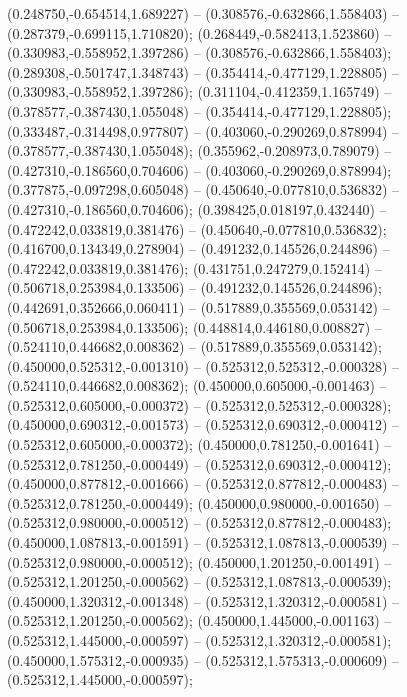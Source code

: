  (0.248750,-0.654514,1.689227) -- (0.308576,-0.632866,1.558403) -- (0.287379,-0.699115,1.710820);
 (0.268449,-0.582413,1.523860) -- (0.330983,-0.558952,1.397286) -- (0.308576,-0.632866,1.558403);
 (0.289308,-0.501747,1.348743) -- (0.354414,-0.477129,1.228805) -- (0.330983,-0.558952,1.397286);
 (0.311104,-0.412359,1.165749) -- (0.378577,-0.387430,1.055048) -- (0.354414,-0.477129,1.228805);
 (0.333487,-0.314498,0.977807) -- (0.403060,-0.290269,0.878994) -- (0.378577,-0.387430,1.055048);
 (0.355962,-0.208973,0.789079) -- (0.427310,-0.186560,0.704606) -- (0.403060,-0.290269,0.878994);
 (0.377875,-0.097298,0.605048) -- (0.450640,-0.077810,0.536832) -- (0.427310,-0.186560,0.704606);
 (0.398425,0.018197,0.432440) -- (0.472242,0.033819,0.381476) -- (0.450640,-0.077810,0.536832);
 (0.416700,0.134349,0.278904) -- (0.491232,0.145526,0.244896) -- (0.472242,0.033819,0.381476);
 (0.431751,0.247279,0.152414) -- (0.506718,0.253984,0.133506) -- (0.491232,0.145526,0.244896);
 (0.442691,0.352666,0.060411) -- (0.517889,0.355569,0.053142) -- (0.506718,0.253984,0.133506);
 (0.448814,0.446180,0.008827) -- (0.524110,0.446682,0.008362) -- (0.517889,0.355569,0.053142);
 (0.450000,0.525312,-0.001310) -- (0.525312,0.525312,-0.000328) -- (0.524110,0.446682,0.008362);
 (0.450000,0.605000,-0.001463) -- (0.525312,0.605000,-0.000372) -- (0.525312,0.525312,-0.000328);
 (0.450000,0.690312,-0.001573) -- (0.525312,0.690312,-0.000412) -- (0.525312,0.605000,-0.000372);
 (0.450000,0.781250,-0.001641) -- (0.525312,0.781250,-0.000449) -- (0.525312,0.690312,-0.000412);
 (0.450000,0.877812,-0.001666) -- (0.525312,0.877812,-0.000483) -- (0.525312,0.781250,-0.000449);
 (0.450000,0.980000,-0.001650) -- (0.525312,0.980000,-0.000512) -- (0.525312,0.877812,-0.000483);
 (0.450000,1.087813,-0.001591) -- (0.525312,1.087813,-0.000539) -- (0.525312,0.980000,-0.000512);
 (0.450000,1.201250,-0.001491) -- (0.525312,1.201250,-0.000562) -- (0.525312,1.087813,-0.000539);
 (0.450000,1.320312,-0.001348) -- (0.525312,1.320312,-0.000581) -- (0.525312,1.201250,-0.000562);
 (0.450000,1.445000,-0.001163) -- (0.525312,1.445000,-0.000597) -- (0.525312,1.320312,-0.000581);
 (0.450000,1.575312,-0.000935) -- (0.525312,1.575313,-0.000609) -- (0.525312,1.445000,-0.000597);
